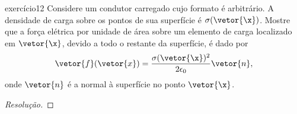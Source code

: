 \begin{exercício}{}{exercício12}
    Considere um condutor carregado cujo formato é arbitrário. A densidade de carga sobre os pontos de sua superfície é \(\sigma(\vetor{\x})\). Mostre que a força elétrica por unidade de área sobre um elemento de carga localizado em \(\vetor{\x}\), devido a todo o restante da superfície, é dado por
    \begin{equation*}
        \vetor{f}(\vetor{x}) = \frac{\sigma(\vetor{\x})^2}{2 \epsilon_0}\vetor{n},
    \end{equation*}
    onde \(\vetor{n}\) é a normal à superfície no ponto \(\vetor{\x}\).
\end{exercício}
\begin{proof}[Resolução]

\end{proof}
